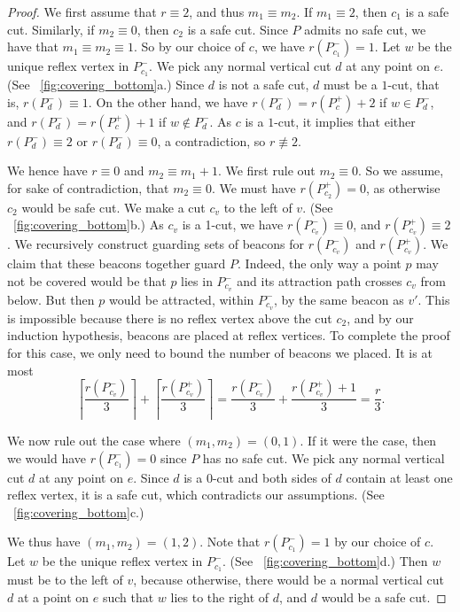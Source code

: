 \documentclass[11pt]{article}
\theoremstyle{definition}
\begin{document}
\begin{proof}
We first assume that $r \equiv 2$, and thus
 $m_1 \equiv m_2$.
 If $m_1 \equiv 2$, then $c_1$ is a safe cut.
 Similarly, if $m_2 \equiv 0$, then $c_2$ is a safe cut.
 Since $P$ admits no safe cut, we have that $m_1 \equiv m_2 \equiv 1$.
 So by our choice of $c$, we have $r(P^-_{c_1}) = 1$.
 Let $w$ be the unique reflex vertex in $P^-_{c_1}$.
 We pick any normal vertical cut $d$ at any point on $e$.
 (See \figurename~\ref{fig:covering_bottom}a.)
Since $d$ is not a safe cut, $d$ must be a $1$-cut, that is, $r(P^-_d) \equiv 1$.
On the other hand, we have $r(P^-_d) = r(P^+_c) + 2$ if $w \in P^-_d$,
and $r(P^-_d) = r(P^+_c) + 1$ if $w \notin P^-_d$.
As $c$ is a $1$-cut, it implies that either $r(P^-_d) \equiv 2$ or $r(P^-_d) \equiv 0$, a contradiction, so $r \not\equiv 2$.

We hence have $r \equiv 0$ and $m_2 \equiv m_1 + 1$. We first rule out $m_2 \equiv 0$.
So we assume, for sake of contradiction, that $m_2 \equiv 0$. We must have $r(P_{c_2}^+) = 0$, 
as otherwise $c_2$ would be safe cut.
We make a cut $c_v$ to the left of $v$.  (See \figurename~\ref{fig:covering_bottom}b.)
As $c_v$ is a 1-cut, we have $r(P_{c_v}^-) \equiv 0$, and $r(P_{c_v}^+) \equiv 2$. We recursively
construct guarding sets of beacons for $r(P_{c_v}^-)$ and $r(P_{c_v}^+)$. We claim that these
beacons together guard $P$. Indeed, the only way a point $p$ may not be covered would
be that $p$ lies in $P^-_{c_v}$ and its attraction path crosses $c_v$ from below.
But then $p$ would be attracted, within $P^-_{c_v}$, by the same beacon as $v'$. This
is impossible because there is no reflex vertex above the cut $c_2$, and by our induction
hypothesis, beacons are placed at reflex vertices. To complete the proof for
this case, we only need to bound the number of beacons we placed. It is at most
\[ \left\lceil \frac{r(P^-_{c_v}) }{3} \right\rceil + \left\lceil \frac{r(P^+_{c_v}) }{3} \right\rceil
  = \frac{r(P^-_{c_v}) }{3} +  \frac{r(P^+_{c_v})+1 }{3} = \frac r 3.
\]	

We now rule out the case where $(m_1, m_2) = (0, 1)$. 
If it were the case, then we would have $r(P^-_{c_1}) = 0$ since $P$ has no safe cut.
We pick any normal vertical cut $d$ at any point on $e$.
Since $d$ is a $0$-cut and both sides of $d$ contain at least one reflex vertex,
it is a safe cut, which contradicts our assumptions.
(See \figurename~\ref{fig:covering_bottom}c.)

We thus have $(m_1, m_2) = (1, 2)$.
Note that $r(P^-_{c_1}) = 1$ by our choice of $c$.
Let $w$ be the unique reflex vertex in $P^-_{c_1}$.
(See \figurename~\ref{fig:covering_bottom}d.)
Then $w$ must be to the left of $v$, because
otherwise, 
there would be a normal vertical cut $d$ at a point on $e$
such that $w$ lies to the right of $d$, and
$d$ would be a safe cut.


\end{proof}
\end{document}
